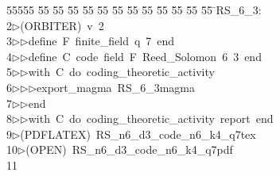 %
%
\begin{tabbing}
55555 \= 55 \= 55 \= 55 \= 55 \= 55 \= 55 \= 55 \= 55 \= 55 \= 55 \= 55 \= 55 \= \>RS\_6\_3:\\[0pt]
2\>$\triangleright$\>(ORBITER)\ v\ 2\ \\[0pt]
3\>$\triangleright$\>$\triangleright$\>define\ F\ finite\_field\ q\ 7\ end\ \\[0pt]
4\>$\triangleright$\>$\triangleright$\>define\ C\ code\ field\ F\ Reed\_Solomon\ 6\ 3\ end\ \\[0pt]
5\>$\triangleright$\>$\triangleright$\>with\ C\ do\ coding\_theoretic\_activity\ \\[0pt]
6\>$\triangleright$\>$\triangleright$\>$\triangleright$\>export\_magma\ RS\_6\_3magma\ \\[0pt]
7\>$\triangleright$\>$\triangleright$\>end\ \\[0pt]
8\>$\triangleright$\>$\triangleright$\>with\ C\ do\ coding\_theoretic\_activity\ report\ end\\[0pt]
9\>$\triangleright$\>(PDFLATEX)\ RS\_n6\_d3\_code\_n6\_k4\_q7tex\\[0pt]
10\>$\triangleright$\>(OPEN)\ RS\_n6\_d3\_code\_n6\_k4\_q7pdf\\[0pt]
11\>\end{tabbing}
